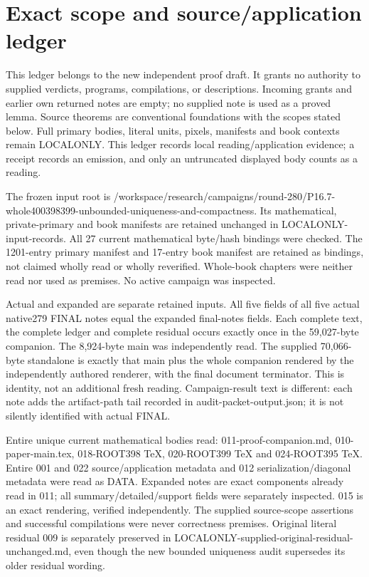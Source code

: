 \documentclass[11pt]{article}
\begin{document}
\clearpage
\section*{Exact scope and source/application ledger}

This ledger belongs to the new independent proof draft. It grants no authority to supplied verdicts, programs, compilations, or descriptions. Incoming grants and earlier own returned notes are empty; no supplied note is used as a proved lemma. Source theorems are conventional foundations with the scopes stated below. Full primary bodies, literal units, pixels, manifests and book contexts remain LOCALONLY. This ledger records local reading/application evidence; a receipt records an emission, and only an untruncated displayed body counts as a reading.

The frozen input root is /workspace/research/campaigns/round-280/P16.7-whole400398399-unbounded-uniqueness-and-compactness. Its mathematical, private-primary and book manifests are retained unchanged in LOCALONLY-input-records. All 27 current mathematical byte/hash bindings were checked. The 1201-entry primary manifest and 17-entry book manifest are retained as bindings, not claimed wholly read or wholly reverified. Whole-book chapters were neither read nor used as premises. No active campaign was inspected.

Actual and expanded are separate retained inputs. All five fields of all five actual native279 FINAL notes equal the expanded final-notes fields. Each complete text, the complete ledger and complete residual occurs exactly once in the 59,027-byte companion. The 8,924-byte main was independently read. The supplied 70,066-byte standalone is exactly that main plus the whole companion rendered by the independently authored renderer, with the final document terminator. This is identity, not an additional fresh reading. Campaign-result text is different: each note adds the artifact-path tail recorded in audit-packet-output.json; it is not silently identified with actual FINAL.

Entire unique current mathematical bodies read: 011-proof-companion.md, 010-paper-main.tex, 018-ROOT398 TeX, 020-ROOT399 TeX and 024-ROOT395 TeX. Entire 001 and 022 source/application metadata and 012 serialization/diagonal metadata were read as DATA. Expanded notes are exact components already read in 011; all summary/detailed/support fields were separately inspected. 015 is an exact rendering, verified independently. The supplied source-scope assertions and successful compilations were never correctness premises. Original literal residual 009 is separately preserved in LOCALONLY-supplied-original-residual-unchanged.md, even though the new bounded uniqueness audit supersedes its older residual wording.
\end{document}
